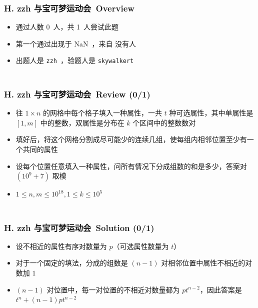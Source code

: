 \documentclass[notheorems]{beamer}
\newcommand{\zhProbH}{zzh 与宝可梦运动会}	\newcommand{\DiffH}{Hard}		\newcommand{\AuthProbH}{\texttt{zzh}}			\newcommand{\TestProbH}{\texttt{skywalkert}}
\newcommand{\TBD}{NaN}	\newcommand{\NONE}{没有人}	\newcommand{\INF}{$\infty$} \newcommand{\Someone}{佚名}
\newcommand{\AccInProbH}{0}	\newcommand{\SubInProbH}{1}	\newcommand{\RatInProbH}{00.00\%}
\newcommand{\FirPenInProbH}{\TBD}		\newcommand{\FirPerInProbH}{\NONE}
\begin{document}
\begin{frame}[label = ProbH]
\frametitle{\\ H. \zhProbH\ Overview}
\begin{spacing}{2.0} \large
\begin{itemize}
\item 通过人数 \AccInProbH\ 人，共 \SubInProbH\ 人尝试此题
\item 第一个通过出现于 \FirPenInProbH\ ，来自 \FirPerInProbH\ 
\item 出题人是 \AuthProbH\ ，验题人是 \TestProbH\
\end{itemize}
\end{spacing}
\end{frame}
\begin{frame}
\frametitle{\\ H. \zhProbH\ Review (\AccInProbH/\SubInProbH)}
\begin{spacing}{1.8} \large
\begin{itemize}
\item 往 $1\times n$ 的网格中每个格子填入一种属性，一共 $t$ 种可选属性，其中单属性是 $[1, m]$ 中的整数，双属性是分布在 $k$ 个区间中的整数数对
\item 填好后，将这个网格分割成尽可能少的连续几组，使每组内相邻位置至少有一个共同的属性
\item 设每个位置任意填入一种属性，问所有情况下分成组数的和是多少，答案对 $(10^9 + 7)$ 取模
\item $1 \leq n, m \leq 10^{18}, 1 \leq k \leq 10^5$
\end{itemize}
\end{spacing}
\end{frame}
\begin{frame}
\frametitle{\\ H. \zhProbH\ Solution (\AccInProbH/\SubInProbH)}
\begin{spacing}{2.0} \large
\begin{itemize}
\item 设不相近的属性有序对数量为 $p$（可选属性数量为 $t$）
\item 对于一个固定的填法，分成的组数是 $(n - 1)$ 对相邻位置中属性不相近的对数加 $1$
\item $(n - 1)$ 对位置中，每一对位置的不相近对数量都为 $p t^{n - 2}$，因此答案是 $t^n + (n - 1) p t^{n - 2}$
\end{itemize}
\end{spacing}
\end{frame}
\end{document}
